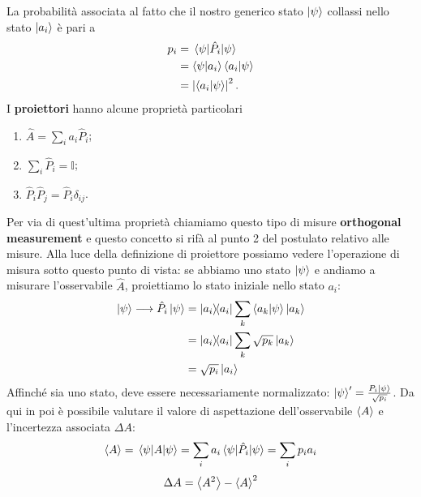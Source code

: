 La probabilità associata al fatto che il nostro generico stato $\ket \psi$ collassi nello stato $\ket{a_i}$ è pari a
\begin{equation*}
    \begin{aligned}
        p_i &= \mel{\psi}{\hat P_i}{\psi} \\
            &= \ip{\psi}{a_i}\ip{a_i}{\psi}\\
            &= \abs{\ip{a_i}{\psi}}^2 \, .
    \end{aligned}
\end{equation*}
I \textbf{proiettori} hanno alcune proprietà particolari
\begin{enumerate}
    \item $\hat A = \sum_i a_i \hat P_i$;
    \item $\sum_i \hat P_i = \mathbb{I}$;
    \item $\hat P_i \hat P_j = \hat P_i\delta_{ij}$.
\end{enumerate}
Per via di quest'ultima proprietà chiamiamo questo tipo di misure \textbf{orthogonal measurement} e questo concetto si rifà al punto 2 del postulato relativo alle misure. Alla luce della definizione di proiettore possiamo vedere l'operazione di misura sotto questo punto di vista: se abbiamo uno stato $\ket \psi$ e andiamo a misurare l'osservabile $\hat A$, proiettiamo lo stato iniziale nello stato $a_i$:
\begin{equation*}
    \begin{aligned}
        \ket \psi \longrightarrow \hat P_i\ket{\psi} &= \op{a_i}{a_i}\sum_{k}\ip{a_k}{\psi}\ket{a_k} \\
                                                     &= \op{a_i}{a_i}\sum_{k}\sqrt{p_k}\ket {a_k} \\
                                                     &= \sqrt{p_i}\ket {a_i}
    \end{aligned}
\end{equation*}
Affinché sia uno stato, deve essere necessariamente normalizzato: $\ket \psi'=\frac{P_i\ket{\psi}}{\sqrt{p_i}}$. Da qui in poi è possibile valutare il valore di aspettazione dell'osservabile $\expval{A}$ e l'incertezza associata $\Delta A$:
\begin{equation*}
    \expval{A}=\expval{A}{\psi}=\sum_i a_i \mel{\psi}{\hat P_i}{\psi}=\sum_i p_ia_i
\end{equation*}
\begin{equation*}
    \Delta A = \expval{ A^2}-\expval{A}^2
\end{equation*}
